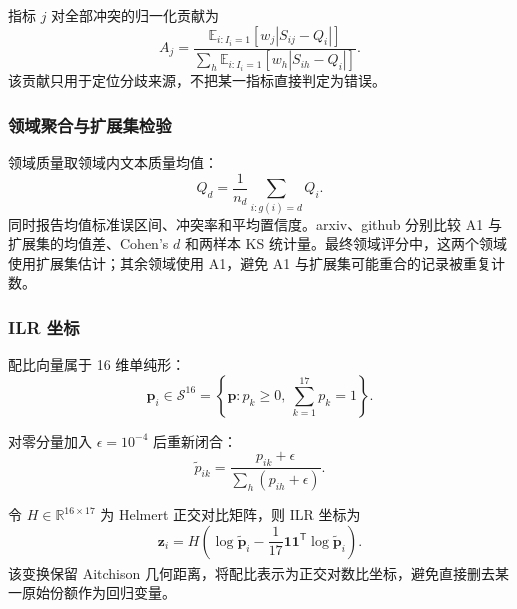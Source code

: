\documentclass[bwprint]{gmcmthesis}
\newcommand{\E}{\mathbb{E}}
\numberwithin{equation}{section}
\numberwithin{figure}{section}
\numberwithin{table}{section}
\begin{document}
        指标 $j$ 对全部冲突的归一化贡献为
        \begin{equation}
        A_j=
        \frac{\E_{i:I_i=1}[w_j|S_{ij}-Q_i|]}
        {\sum_h\E_{i:I_i=1}[w_h|S_{ih}-Q_i|]}.
        \label{eq:attribution}
        \end{equation}
        该贡献只用于定位分歧来源，不把某一指标直接判定为错误。

        
        \subsubsection{领域聚合与扩展集检验}  %
        领域质量取领域内文本质量均值：
        \begin{equation}
        Q_d=\frac1{n_d}\sum_{i:g(i)=d}Q_i.
        \label{eq:domainq}
        \end{equation}
        同时报告均值标准误区间、冲突率和平均置信度。arxiv、github 分别比较 A1 与扩展集的均值差、Cohen's $d$ 和两样本 KS 统计量。最终领域评分中，这两个领域使用扩展集估计；其余领域使用 A1，避免 A1 与扩展集可能重合的记录被重复计数。
        
        
        \subsubsection{ILR 坐标}  %
        配比向量属于 16 维单纯形：
        \begin{equation}
        \bm p_i\in\mathcal S^{16}=\left\{\bm p:p_k\ge0,\ \sum_{k=1}^{17}p_k=1\right\}.
        \label{eq:simplex}
        \end{equation}
        
        对零分量加入 $\epsilon=10^{-4}$ 后重新闭合：
        \begin{equation}
        \widetilde p_{ik}=\frac{p_{ik}+\epsilon}{\sum_h(p_{ih}+\epsilon)}.
        \label{eq:closure}
        \end{equation}
        
        令 $H\in\mathbb R^{16\times17}$ 为 Helmert 正交对比矩阵，则 ILR 坐标为
        \begin{equation}
        \bm z_i=H\left(\log\widetilde{\bm p}_i-
        \frac1{17}\bm 1\bm 1^{\mathsf T}\log\widetilde{\bm p}_i\right).
        \label{eq:ilr}
        \end{equation}
        该变换保留 Aitchison 几何距离，将配比表示为正交对数比坐标\textsuperscript{\cite{egozcue2003ilr}}，避免直接删去某一原始份额作为回归变量。

        
\end{document}
